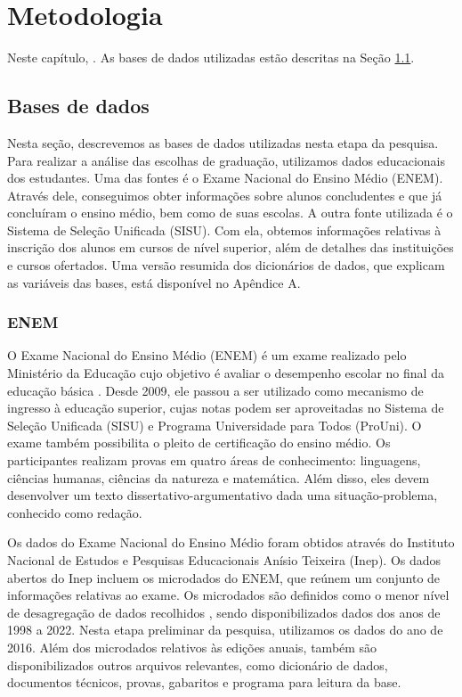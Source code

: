 
\chapter{Metodologia}
\label{chap:metodologia}

Neste capítulo, . As bases de dados utilizadas estão descritas na Seção \ref{sec:bases}. 

\section{Bases de dados}
\label{sec:bases}
Nesta seção, descrevemos as bases de dados utilizadas nesta etapa da pesquisa. Para realizar a análise das escolhas de graduação, utilizamos dados educacionais dos estudantes. Uma das fontes é o Exame Nacional do Ensino Médio (ENEM). Através dele, conseguimos obter informações sobre alunos concludentes e que já concluíram o ensino médio, bem como de suas escolas. A outra fonte utilizada é o Sistema de Seleção Unificada (SISU). Com ela, obtemos informações relativas à inscrição dos alunos em cursos de nível superior, além de detalhes das instituições e cursos ofertados. Uma versão resumida dos dicionários de dados, que explicam as variáveis das bases, está disponível no Apêndice A. 

\subsection{ENEM}
O Exame Nacional do Ensino Médio (ENEM) é um exame realizado pelo Ministério da Educação cujo objetivo é avaliar o desempenho escolar no final da educação básica \autocite{inep:1}. Desde 2009, ele passou a ser utilizado como mecanismo de ingresso à educação superior, cujas notas podem ser aproveitadas no Sistema de Seleção Unificada (SISU) e Programa Universidade para Todos (ProUni). O exame também possibilita o pleito de certificação do ensino médio. Os participantes realizam provas em quatro áreas de conhecimento: linguagens, ciências humanas, ciências da natureza e matemática. Além disso, eles devem desenvolver um texto dissertativo-argumentativo dada uma situação-problema, conhecido como redação.

Os dados do Exame Nacional do Ensino Médio foram obtidos através do Instituto Nacional de Estudos e Pesquisas Educacionais Anísio Teixeira (Inep). Os dados abertos do Inep incluem os microdados do ENEM, que reúnem um conjunto de informações relativas ao exame. Os microdados são definidos como o menor nível de desagregação de dados recolhidos \autocite{inep:2}, sendo disponibilizados dados dos anos de 1998 a 2022. Nesta etapa preliminar da pesquisa, utilizamos os dados do ano de 2016. Além dos microdados relativos às edições anuais, também são disponibilizados outros arquivos relevantes, como dicionário de dados, documentos técnicos, provas, gabaritos e programa para leitura da base.

